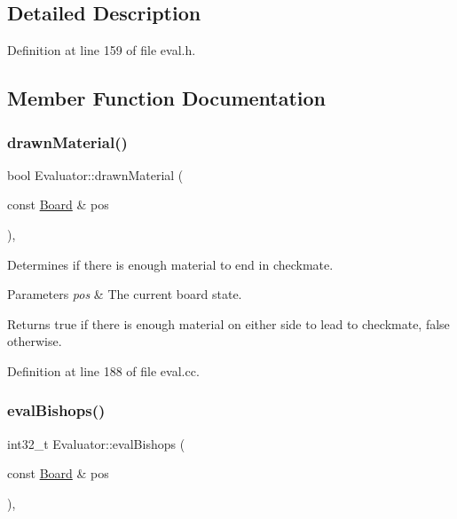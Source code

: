 \subsection{Detailed Description}


Definition at line 159 of file eval.\+h.



\subsection{Member Function Documentation}
\mbox{\label{classEvaluator_aec21b1e28f162b7f1e4edc9e8f725a8b}} 
\subsubsection{\texorpdfstring{drawn\+Material()}{drawnMaterial()}}
{\footnotesize\ttfamily bool Evaluator\+::drawn\+Material (\begin{DoxyParamCaption}\item[{const \mbox{\hyperlink{classBoard}{Board}} \&}]{pos }\end{DoxyParamCaption})\hspace{0.3cm}{\ttfamily [private]}, {\ttfamily [noexcept]}}



Determines if there is enough material to end in checkmate. 


\begin{DoxyParams}{Parameters}
{\em pos} & The current board state. \\
\hline
\end{DoxyParams}
\begin{DoxyReturn}{Returns}
true if there is enough material on either side to lead to checkmate, false otherwise. 
\end{DoxyReturn}


Definition at line 188 of file eval.\+cc.

\mbox{\label{classEvaluator_ab8235a37e631665e0dbdbffdddf015f7}} 
\subsubsection{\texorpdfstring{eval\+Bishops()}{evalBishops()}}
{\footnotesize\ttfamily int32\+\_\+t Evaluator\+::eval\+Bishops (\begin{DoxyParamCaption}\item[{const \mbox{\hyperlink{classBoard}{Board}} \&}]{pos }\end{DoxyParamCaption})\hspace{0.3cm}{\ttfamily [private]}, {\ttfamily [noexcept]}}



